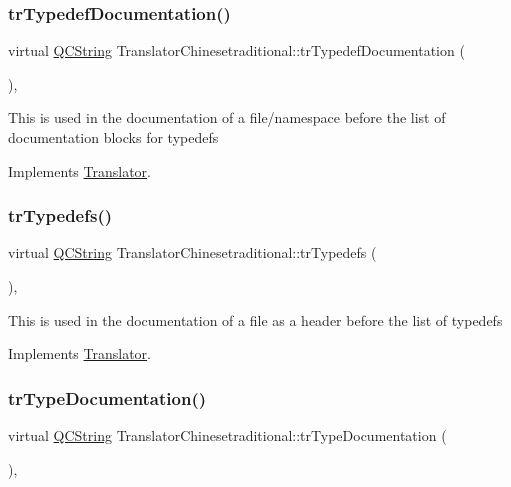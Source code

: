 \subsubsection{\texorpdfstring{trTypedefDocumentation()}{trTypedefDocumentation()}}
{\footnotesize\ttfamily virtual \mbox{\hyperlink{class_q_c_string}{Q\+C\+String}} Translator\+Chinesetraditional\+::tr\+Typedef\+Documentation (\begin{DoxyParamCaption}{ }\end{DoxyParamCaption})\hspace{0.3cm}{\ttfamily [inline]}, {\ttfamily [virtual]}}

This is used in the documentation of a file/namespace before the list of documentation blocks for typedefs 

Implements \mbox{\hyperlink{class_translator}{Translator}}.

\mbox{\label{class_translator_chinesetraditional_ac2de12d719aed877943718f00ba68b9a}} 
\subsubsection{\texorpdfstring{trTypedefs()}{trTypedefs()}}
{\footnotesize\ttfamily virtual \mbox{\hyperlink{class_q_c_string}{Q\+C\+String}} Translator\+Chinesetraditional\+::tr\+Typedefs (\begin{DoxyParamCaption}{ }\end{DoxyParamCaption})\hspace{0.3cm}{\ttfamily [inline]}, {\ttfamily [virtual]}}

This is used in the documentation of a file as a header before the list of typedefs 

Implements \mbox{\hyperlink{class_translator}{Translator}}.

\mbox{\label{class_translator_chinesetraditional_aadf1f95dcc6f412dba64f55769148294}} 
\subsubsection{\texorpdfstring{trTypeDocumentation()}{trTypeDocumentation()}}
{\footnotesize\ttfamily virtual \mbox{\hyperlink{class_q_c_string}{Q\+C\+String}} Translator\+Chinesetraditional\+::tr\+Type\+Documentation (\begin{DoxyParamCaption}{ }\end{DoxyParamCaption})\hspace{0.3cm}{\ttfamily [inline]}, {\ttfamily [virtual]}}

